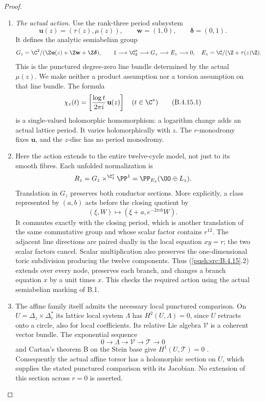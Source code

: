 \begin{proof}
\begin{enumerate}[label=\arabic*.,leftmargin=*]
\item \emph{The actual action.}
Use the rank-three period subsystem
\[
 \mathbf u(z)=(\tau(z),\mu(z)),\qquad
 \mathbf w=(1,0),\qquad \boldsymbol\delta=(0,1).
\]
It defines the analytic semiabelian group
\[
 G_z=\C^2/(\Z\mathbf u(z)+\Z\mathbf w+
                    \Z\boldsymbol\delta),
 \qquad
 1\longrightarrow\C^*_{\delta}\longrightarrow G_z
       \longrightarrow E_z\longrightarrow0,
 \quad E_z=\C/(\Z+\tau(z)\Z).
\]
This is the punctured degree-zero line bundle determined
by the actual $\mu(z)$. We make neither a product assumption
nor a torsion assumption on that line bundle. The formula
\[
 \chi_z(t)=
 \left[\frac{\log t}{2\pi i}\,\mathbf u(z)\right]
 \quad(t\in\C^*)
 \tag{B.4.15.1}
\]
is a single-valued holomorphic homomorphism: a logarithm
change adds an actual lattice period. It varies
holomorphically with $z$. The $r$-monodromy fixes
$\mathbf u$, and the $z$-disc has no period monodromy.

\item Here the action extends to the entire twelve-cycle model,
not just to its smooth fibres. Each unfolded normalization
is
\[
 R_z=G_z\mathbin{\times^{\C^*_{\delta}}}\PP^1
       =\PP_{E_z}(\OO\oplus L_z).
\]
Translation in $G_z$ preserves both conductor sections.
More explicitly, a class represented by $(a,b)$ acts
before the closing quotient by
\[
  (\xi,W)\longmapsto
            (\xi+a,e^{-2\pi i b}W).
 \tag{B.4.15.2}
\]
It commutes exactly with the closing period, which is
another translation of the same commutative group and
whose scalar factor contains $r^{12}$. The adjacent line
directions are paired dually in the local equation $xy=r$;
the two scalar factors cancel. Scalar multiplication also
preserves the one-dimensional toric subdivision producing
the twelve components. Thus (\ref{push:src:B.4.15}.2) extends over every
node, preserves each branch, and changes a branch equation
$x$ by a unit times $x$. This checks the required action
using the actual semiabelian marking of B.1.

\item The affine family itself admits the necessary local
punctured comparison. On
$U=\Delta_z\times\Delta_r^*$ its lattice local system
$\Lambda$ has $H^2(U,\Lambda)=0$, since $U$ retracts onto
a circle, also for local coefficients. Its relative Lie
algebra $\mathcal V$ is a coherent vector bundle. The
exponential sequence
\[
 0\longrightarrow\Lambda\longrightarrow\mathcal V
       \longrightarrow\mathcal T\longrightarrow0
\]
and Cartan's theorem B on the Stein base give
$H^1(U,\mathcal T)=0$ \citep{Cartan1952B_AB}.
Consequently the actual affine torsor has a holomorphic
section on $U$, which supplies the stated punctured
comparison with its Jacobian. No extension of this
section across $r=0$ is asserted.


\end{enumerate}
\end{proof}
